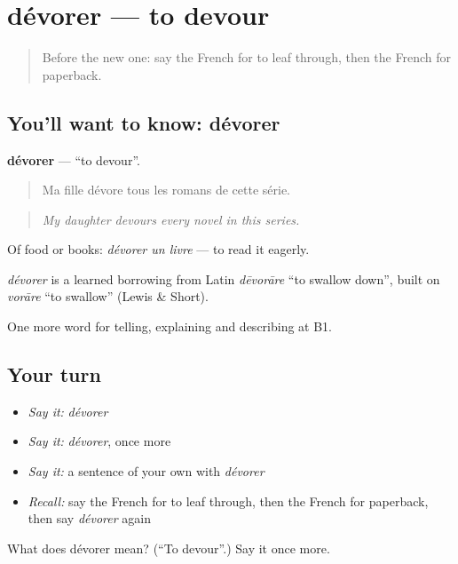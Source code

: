 \section[dévorer]{dévorer — to devour}

\label{lesson:FR-C520-devorer}



\begin{quote}
Before the new one: say the French for to leaf through, then the French for paperback.
\end{quote}

\subsection*{You'll want to know: dévorer}
\textbf{dévorer} — \textquotedblleft{}to devour\textquotedblright{}.

\begin{quote}
Ma fille dévore tous les romans de cette série.
\end{quote}

\begin{quote}
\emph{My daughter devours every novel in this series.}
\end{quote}

Of food or books: \emph{dévorer un livre} — to read it eagerly.

\begin{cousinweb}
\emph{dévorer} is a learned borrowing from Latin \emph{dēvorāre} \textquotedblleft{}to swallow down\textquotedblright{}, built on \emph{vorāre} \textquotedblleft{}to swallow\textquotedblright{} (Lewis \& Short).
\end{cousinweb}

\begin{grammarlens}[title={What you've built}]
One more word for telling, explaining and describing at B1.
\end{grammarlens}

\subsection*{Your turn}
\begin{itemize}
\raggedright
  \item \emph{Say it:} \emph{dévorer}
  \item \emph{Say it:} \emph{dévorer}, once more
  \item \emph{Say it:} a sentence of your own with \emph{dévorer}
  \item \emph{Recall:} say the French for to leaf through, then the French for paperback, then say \emph{dévorer} again
\end{itemize}

\begin{tcolorbox}[breakable,colback=teal!4,colframe=teal!35!black,title={Before you move on}]
What does dévorer mean? (\textquotedblleft{}To devour\textquotedblright{}.) Say it once more.
\end{tcolorbox}
